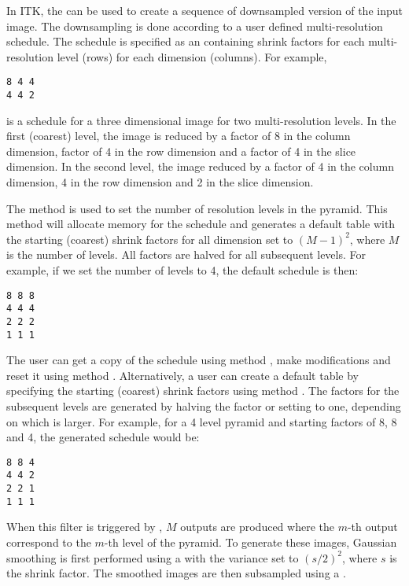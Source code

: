 

In ITK, the  can be used to create a
sequence of downsampled version of the input image.  The downsampling is done
according to a user defined multi-resolution schedule. The schedule is
specified as an  containing shrink factors for each
multi-resolution level (rows) for each dimension (columns). For example,

\begin{verbatim}
8 4 4
4 4 2
\end{verbatim}

is a schedule for a three dimensional image for two multi-resolution levels. 
In the first (coarest) level, the image is reduced by a factor of 8 
in the column dimension, factor of 4 in the row dimension and a factor
of 4 in the slice dimension. In the second level, the image reduced
by a factor of 4 in the column dimension, 4 in the row dimension and
2 in the slice dimension.


The method  is used to set the number of
resolution levels in the pyramid. This method will allocate memory
for the schedule and generates a default table with the starting
(coarest) shrink factors for all dimension set to $(M-1)^2$, 
where $M$ is the number of levels. All factors are halved for
all subsequent levels. For example, if we set the number of levels
to 4, the default schedule is then:

\begin{verbatim}
8 8 8
4 4 4
2 2 2
1 1 1
\end{verbatim}


The user can get a copy of the schedule using method ,
make modifications and reset it using method .
Alternatively, a user can create a default table by specifying the
starting (coarest) shrink factors using method 
. The factors for the subsequent
levels are generated by halving the factor or setting to one, 
depending on which is larger. For example, for a 4 level pyramid
and starting factors of 8, 8 and 4, the generated schedule would be:

\begin{verbatim}
8 8 4
4 4 2
2 2 1
1 1 1
\end{verbatim}

When this filter is triggered by , $M$ outputs are produced
where the $m$-th output correspond to the $m$-th level of the pyramid.
To generate these images, Gaussian smoothing is first performed using a
 with the variance set to $(s/2)^2$,
where $s$ is the shrink factor. The smoothed images are then subsampled using
a .

